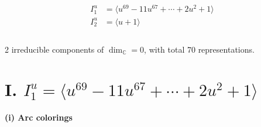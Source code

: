 \documentclass[1p]{elsarticle_modified}
\theoremstyle{definition}
\begin{document}
\begin{align*}
I^u_{1}&=\langle 
u^{69}-11 u^{67}+\cdots+2 u^2+1\rangle \\
I^u_{2}&=\langle 
u+1\rangle \\
\\
\end{align*}
\raggedright * 2 irreducible components of $\dim_{\mathbb{C}}=0$, with total 70 representations.\\
\newpage
\renewcommand{\arraystretch}{1}
\centering \section*{I. $I^u_{1}= \langle u^{69}-11 u^{67}+\cdots+2 u^2+1 \rangle$}
\flushleft \textbf{(i) Arc colorings}\\
\end{document}
